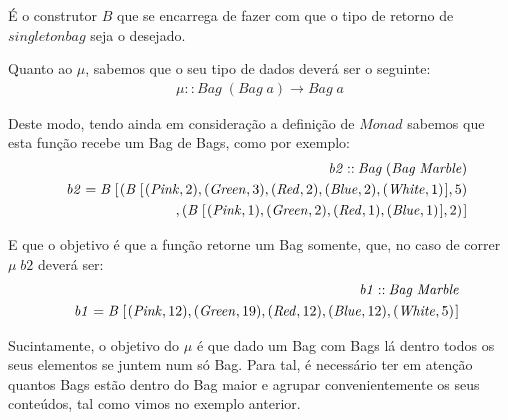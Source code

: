 \documentclass[a4paper]{article}
\newcommand{\Conid}[1]{\mathit{#1}}
\newcommand{\Varid}[1]{\mathit{#1}}
\begin{document}
É o construtor \ensuremath{\mathit B} que se encarrega de fazer com que o
tipo de retorno de \ensuremath{\Varid{singletonbag}} seja o desejado.

\vspace{0.3cm}

Quanto ao \ensuremath{\mu }, sabemos que o seu tipo de dados deverá ser o seguinte:
\begin{eqnarray*}
\ensuremath{\mu \mathbin{::}\Conid{Bag}\;(\Conid{Bag}\;\Varid{a})\to \Conid{Bag}\;\Varid{a}}
\end{eqnarray*}

Deste modo, tendo ainda em consideração a definição de \ensuremath{\Conid{Monad}}
sabemos que esta função recebe um Bag de Bags, como por
exemplo:
\begin{eqnarray*}
\start
\ensuremath{\Varid{b2}\mathbin{::}\Conid{Bag}\;(\Conid{Bag}\;\Conid{Marble})}
\more
\ensuremath{\Varid{b2}\mathrel{=}\mathit B\;[\mskip1.5mu (\mathit B\;[\mskip1.5mu (\Conid{Pink},\mathrm{2}),(\Conid{Green},\mathrm{3}),(\Conid{Red},\mathrm{2}),(\Conid{Blue},\mathrm{2}),(\Conid{White},\mathrm{1})\mskip1.5mu],\mathrm{5})}
\more
\ensuremath{,(\mathit B\;[\mskip1.5mu (\Conid{Pink},\mathrm{1}),(\Conid{Green},\mathrm{2}),(\Conid{Red},\mathrm{1}),(\Conid{Blue},\mathrm{1})\mskip1.5mu],\mathrm{2})\mskip1.5mu]}
\end{eqnarray*}

E que o objetivo é que a função retorne um Bag somente, que, no
caso de correr \ensuremath{\mu \;\Varid{b2}} deverá ser:
\begin{eqnarray*}
\start
\ensuremath{\Varid{b1}\mathbin{::}\Conid{Bag}\;\Conid{Marble}}
\more
\ensuremath{\Varid{b1}\mathrel{=}\mathit B\;[\mskip1.5mu (\Conid{Pink},\mathrm{12}),(\Conid{Green},\mathrm{19}),(\Conid{Red},\mathrm{12}),(\Conid{Blue},\mathrm{12}),(\Conid{White},\mathrm{5})\mskip1.5mu]}
\end{eqnarray*}

Sucintamente, o objetivo do \ensuremath{\mu } é que dado um Bag com Bags lá dentro
todos os seus elementos se juntem num só Bag. Para tal, é necessário
ter em atenção quantos Bags estão dentro do Bag maior e
agrupar convenientemente os seus conteúdos,
tal como vimos no exemplo anterior.
\end{document}
